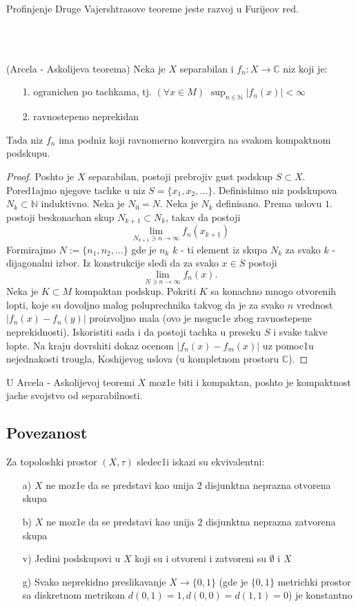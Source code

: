 \documentclass[a4paper,12pt]{article}
\newcommand{\NN}{\mathbb{N}}
\newcommand{\CC}{\mathbb{C}}
\newcommand{\ps}{\subset}
\begin{document}
\begin{nap}
Profinjenje Druge Vajershtrasove teoreme jeste razvoj u Furijeov red.
\end{nap}
\\ \\
\begin{tma}
(Arcela - Askolijeva teorema) Neka je $X$ separabilan i $f_n: X \to \CC$ niz koji je:
\begin{itemize}
\item[1.] ogranichen po tachkama, tj. $(\forall x \in M)$ $\sup_{n \in \NN} |f_n(x)| < \infty$
\item[2.] ravnostepeno neprekidan
\end{itemize}
Tada niz $f_n$ ima podniz koji ravnomerno konvergira na svakom kompaktnom podskupu.
\end{tma}
\begin{proof}
Poshto je $X$ separabilan, postoji prebrojiv gust podskup $S \ps X$. Pored1ajmo njegove tachke u niz $S = \{x_1, x_2, \dots \}$. Definishimo niz podskupova $N_k \ps \NN$ induktivno. Neka je $N_0 = N$. Neka je $N_k$ definisano. Prema uslovu $1.$ postoji beskonachan skup $N_{k+1} \ps N_k$, takav da postoji 
\[\lim_{ N_{k+1}\ni n \to \infty} f_n(x_{k+1}) \]
Formirajmo $N := \{n_1, n_2, \dots \}$ gde je $n_k$ $k$ - ti element iz skupa $N_k$ za svako $k$ - dijagonalni izbor. Iz konstrukcije
sledi da za svako $x\in S$ postoji
	\[ \lim_{N\ni n \to \infty}f_n(x) .\] 
	Neka je $K\ps M$ kompaktan podskup. Pokriti $K$ sa konachno mnogo otvorenih lopti, koje su dovoljno malog poluprechnika takvog
	da je za svako  $n$ vrednost $|f_n(x) - f_n(y)|$ proizvoljno mala (ovo je moguc1e zbog ravnostepene neprekidnosti).
	Iskoristiti sada i da postoji tachka u preseku $S$ i svake takve lopte. Na kraju dovrshiti dokaz ocenom
	$|f_n(x) - f_m(x)|$ uz pomoc1u nejednakosti trougla, Koshijevog uslova (u kompletnom prostoru $\CC$).
\end{proof}

\begin{nap}
U Arcela - Askolijevoj teoremi $X$ moz1e biti i kompaktan, poshto je kompakt\-nost jache svojstvo od separabilnosti.
\end{nap}
\subsection{Povezanost}

\begin{tma}
Za topoloshki prostor $(X, \tau)$ sledec1i iskazi su ekvivalentni:
\begin{itemize}
\item[a)] $X$ ne moz1e da se predstavi kao unija $2$ disjunktna neprazna otvorena skupa
\item[b)]  $X$ ne moz1e da se predstavi kao unija $2$ disjunktna neprazna zatvorena skupa
\item[v)] Jedini podskupovi u $X$ koji su i otvoreni i zatvoreni su $\emptyset$ i $X$
\item[g)] Svako neprekidno preslikavanje $X \to \{0,1\}$ (gde je $\{0,1\}$ metrichki prostor sa diskretnom metrikom $d(0,1) = 1, d(0,0) = d(1,1) = 0$) je konstantno
\end{itemize}
\end{tma}
\end{document}
